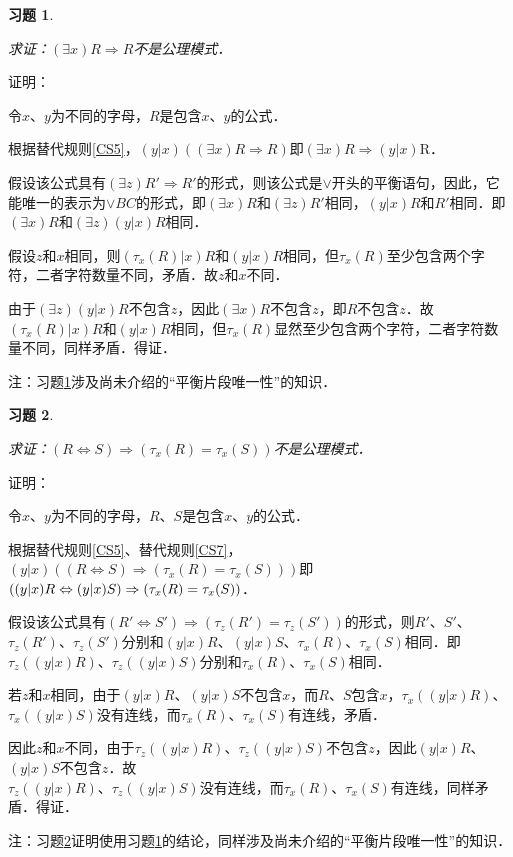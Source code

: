 \documentclass[12pt, a4paper, oneside]{book}
\newtheorem{exer}{习题}
\begin{document}
			\begin{exer}\label{exer26}
				\hfill\par
				求证：$(\exists x)R\Rightarrow R$不是公理模式．
			\end{exer}	
			证明：
			\par
			令$x$、$y$为不同的字母，$R$是包含$x$、$y$的公式．
			\par
			根据替代规则\ref{CS5}，$(y|x)((\exists x)R\Rightarrow R)$即$(\exists x)R\Rightarrow (y|x)$R．
			\par
			假设该公式具有$(\exists z)R'\Rightarrow R'$的形式，则该公式是$\lor$开头的平衡语句，因此，它能唯一的表示为$\lor BC$的形式，即$(\exists x)R$和$(\exists z)R'$相同，$(y|x)R$和$R'$相同．即$(\exists x)R$和$(\exists z)(y|x)R$相同．
			\par
			假设$z$和$x$相同，则$(\tau_x(R)|x)R$和$(y|x)R$相同，但$\tau_x(R)$至少包含两个字符，二者字符数量不同，矛盾．故$z$和$x$不同．
			\par
			由于$(\exists z)(y|x)R$不包含$z$，因此$(\exists x)R$不包含$z$，即$R$不包含$z$．故$(\tau_x(R)|x)R$和$(y|x)R$相同，但$\tau_x(R)$显然至少包含两个字符，二者字符数量不同，同样矛盾．得证．
			\par
			注：习题\ref{exer26}涉及尚未介绍的“平衡片段唯一性”的知识．			
			
			\begin{exer}\label{exer27}
				\hfill\par
				求证：$(R\Leftrightarrow S)\Rightarrow (\tau_x(R)=\tau_x(S))$不是公理模式．
			\end{exer}	
			证明：
			\par
			令$x$、$y$为不同的字母，$R$、$S$是包含$x$、$y$的公式．
			\par
			根据替代规则\ref{CS5}、替代规则\ref{CS7}，$(y|x)((R\Leftrightarrow S)\Rightarrow (\tau_x(R)=\tau_x(S)))$即$((y|x)R\Leftrightarrow (y|x)S)\\\Rightarrow (\tau_x(R)=\tau_x(S))$．
			\par
			假设该公式具有$(R'\Leftrightarrow S')\Rightarrow (\tau_z(R')=\tau_z(S'))$的形式，则$R'$、$S'$、$\tau_z(R')$、$\tau_z(S')$分别和$(y|x)R$、$(y|x)S$、$\tau_x(R)$、$\tau_x(S)$相同．即$\tau_z((y|x)R)$、$\tau_z((y|x)S)$分别和$\tau_x(R)$、$\tau_x(S)$相同．
			\par
			若$z$和$x$相同，由于$(y|x)R$、$(y|x)S$不包含$x$，而$R$、$S$包含$x$，$\tau_x((y|x)R)$、$\tau_x((y|x)S)$没有连线，而$\tau_x(R)$、$\tau_x(S)$有连线，矛盾．
			\par
			因此$z$和$x$不同，由于$\tau_z((y|x)R)$、$\tau_z((y|x)S)$不包含$z$，因此$(y|x)R$、$(y|x)S$不包含$z$．故\\$\tau_z((y|x)R)$、$\tau_z((y|x)S)$没有连线，而$\tau_x(R)$、$\tau_x(S)$有连线，同样矛盾．得证．
			\par
			注：习题\ref{exer27}证明使用习题\ref{exer26}的结论，同样涉及尚未介绍的“平衡片段唯一性”的知识．			
\end{document}
